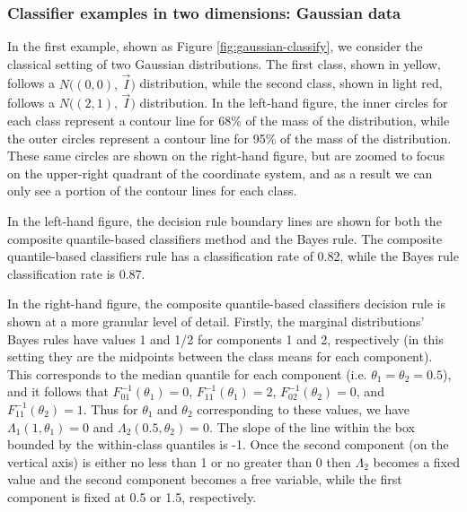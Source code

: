 \subsubsection{Classifier examples in two dimensions: Gaussian data}
\label{sec:classifier-examples-gaussian}

In the first example, shown as Figure \ref{fig:gaussian-classify}, we consider
the classical setting of two Gaussian distributions.  The first class, shown in
yellow, follows a $N \big( (0, 0),\, \vec{I} \big)$ distribution, while the
second class, shown in light red, follows a $N \big( (2, 1),\, \vec{I} \big)$
distribution.  In the left-hand figure, the inner circles for each class
represent a contour line for 68\% of the mass of the distribution, while the
outer circles represent a contour line for 95\% of the mass of the distribution.
These same circles are shown on the right-hand figure, but are zoomed to focus
on the upper-right quadrant of the coordinate system, and as a result we can
only see a portion of the contour lines for each class.

In the left-hand figure, the decision rule boundary lines are shown for both the
composite quantile-based classifiers method and the Bayes rule.  The composite
quantile-based classifiers rule has a classification rate of 0.82, while the
Bayes rule classification rate is 0.87.

In the right-hand figure, the composite quantile-based classifiers decision rule
is shown at a more granular level of detail.  Firstly, the marginal
distributions' Bayes rules have values 1 and 1/2 for components 1 and 2,
respectively (in this setting they are the midpoints between the class means for
each component).  This corresponds to the median quantile for each component
(i.e. $\theta_1 = \theta_2 = 0.5$), and it follows that
$F_{01}^{-1}(\theta_1) = 0$, $F_{11}^{-1}(\theta_1) = 2$,
$F_{02}^{-1}(\theta_2) = 0$, and $F_{11}^{-1}(\theta_2) = 1$.  Thus for
$\theta_1$ and $\theta_2$ corresponding to these values, we have
$\Lambda_1(1, \theta_1) = 0$ and $\Lambda_2(0.5, \theta_2) = 0$.  The slope of
the line within the box bounded by the within-class quantiles is -1.  Once the
second component (on the vertical axis) is either no less than 1 or no greater
than 0 then $\Lambda_2$ becomes a fixed value and the second component becomes a
free variable, while the first component is fixed at 0.5 or 1.5, respectively.

